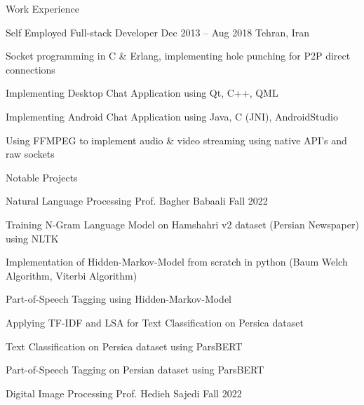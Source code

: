 \documentclass[]{main}
\begin{document}
\begin{section}{Work Experience}
    \begin{subsection}{ Self Employed }{ Full-stack Developer }{ Dec 2013 -- Aug 2018 }{ Tehran, Iran }
            \item Socket programming in C \& Erlang, implementing hole punching for P2P direct connections 
            \item Implementing Desktop Chat Application using Qt, C++, QML 
            \item Implementing Android Chat Application using Java, C (JNI), AndroidStudio 
            \item Using FFMPEG to implement audio \& video streaming using native API's and raw sockets 
            \end{subsection}
    \end{section}

\begin{section}{Notable Projects}
    \begin{subsection}{ Natural Language Processing }{ Prof. Bagher Babaali }{ Fall 2022 }{  }
            \item Training N-Gram Language Model on Hamshahri v2 dataset (Persian Newspaper) using NLTK \;\href{ https://github.com/ckoliber/nlpexercises/blob/main/src/exercise1.ipynb }{\faExternalLink*}
            \item Implementation of Hidden-Markov-Model from scratch in python (Baum Welch Algorithm, Viterbi Algorithm) \;\href{ https://github.com/ckoliber/nlpexercises/blob/main/src/hmm/hmm.py }{\faExternalLink*}
            \item Part-of-Speech Tagging using Hidden-Markov-Model \;\href{ https://github.com/ckoliber/nlpexercises/blob/main/src/exercise3.ipynb }{\faExternalLink*}
            \item Applying TF-IDF and LSA for Text Classification on Persica dataset \;\href{ https://github.com/ckoliber/nlpexercises/blob/main/src/exercise4.ipynb }{\faExternalLink*}
            \item Text Classification on Persica dataset using ParsBERT \;\href{ https://github.com/ckoliber/nlpexercises/blob/main/src/exercise5.ipynb }{\faExternalLink*}
            \item Part-of-Speech Tagging on Persian dataset using ParsBERT \;\href{ https://github.com/ckoliber/nlpexercises/blob/main/src/exercise6.ipynb }{\faExternalLink*}
            \end{subsection}
    \begin{subsection}{ Digital Image Processing }{ Prof. Hedieh Sajedi }{ Fall 2022 }{  }

\end{subsection}
\end{section}
\end{document}
